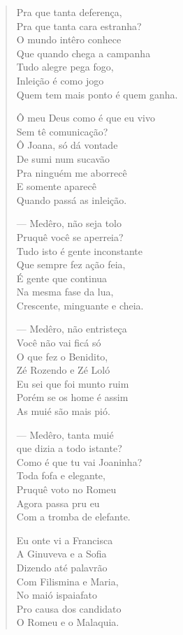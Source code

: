 \begin{verse}
Pra que tanta deferença,\\
Pra que tanta cara estranha?\\
O mundo intêro conhece\\
Que quando chega a campanha\\
Tudo alegre pega fogo,\\
Inleição é como jogo\\
Quem tem mais ponto é quem ganha.

Ô meu Deus como é que eu vivo\\
Sem tê comunicação?\\
Ô Joana, só dá vontade\\
De sumi num sucavão\\
Pra ninguém me aborrecê\\
E somente aparecê\\
Quando passá as inleição.

---  Medêro, não seja tolo\\
Pruquê você se aperreia?\\
Tudo isto é gente inconstante\\
Que sempre fez ação feia,\\
É gente que continua\\
Na mesma fase da lua,\\
Crescente, minguante e cheia.

--- Medêro, não entristeça\\
Você não vai ficá só\\
O que fez o Benidito,\\
Zé Rozendo e Zé Loló\\
Eu sei que foi munto ruim\\
Porém se os home é assim\\
As muié são mais pió.

---  Medêro, tanta muié\\
que dizia a todo istante?\\
Como é que tu vai Joaninha?\\
Toda fofa e elegante,\\
Pruquê voto no Romeu\\
Agora passa pru eu\\
Com a tromba de elefante.

Eu onte vi a Francisca\\
A Ginuveva e a Sofia\\
Dizendo até palavrão\\
Com Filismina e Maria,\\
No maió ispaiafato\\ 
Pro causa dos candidato\\
O Romeu e o Malaquia.


\end{verse}

